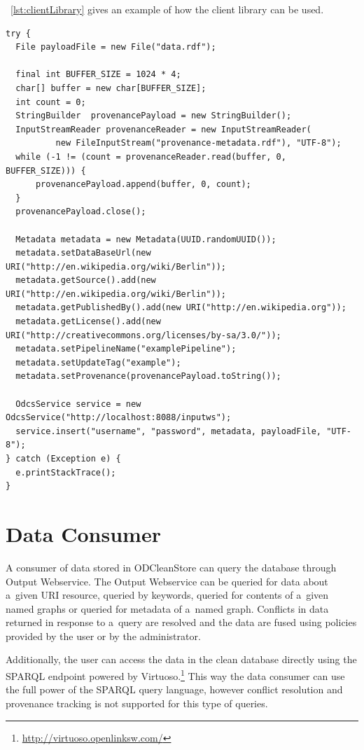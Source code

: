 \lstlistingname~\ref{lst:clientLibrary} gives an example of how the client library can be used.

\begin{lstlisting}[caption={Example usage of Input Webservice client library},label=lst:clientLibrary]
try {
  File payloadFile = new File("data.rdf");

  final int BUFFER_SIZE = 1024 * 4;
  char[] buffer = new char[BUFFER_SIZE];
  int count = 0;
  StringBuilder  provenancePayload = new StringBuilder();
  InputStreamReader provenanceReader = new InputStreamReader(
          new FileInputStream("provenance-metadata.rdf"), "UTF-8");
  while (-1 != (count = provenanceReader.read(buffer, 0, BUFFER_SIZE))) {
      provenancePayload.append(buffer, 0, count);
  }
  provenancePayload.close();

  Metadata metadata = new Metadata(UUID.randomUUID());
  metadata.setDataBaseUrl(new URI("http://en.wikipedia.org/wiki/Berlin"));
  metadata.getSource().add(new URI("http://en.wikipedia.org/wiki/Berlin"));
  metadata.getPublishedBy().add(new URI("http://en.wikipedia.org"));
  metadata.getLicense().add(new URI("http://creativecommons.org/licenses/by-sa/3.0/")); 
  metadata.setPipelineName("examplePipeline");
  metadata.setUpdateTag("example"); 
  metadata.setProvenance(provenancePayload.toString()); 

  OdcsService service = new OdcsService("http://localhost:8088/inputws");
  service.insert("username", "password", metadata, payloadFile, "UTF-8");
} catch (Exception e) {
  e.printStackTrace();
}
\end{lstlisting}

\section{Data Consumer}
\label{sec:outputWS}

A consumer of data stored in ODCleanStore can query the database through Output Webservice. The Output Webservice can be queried for data about a~given URI resource, queried by keywords, queried for contents of a~given named graphs or queried for metadata of a~named graph. Conflicts in data returned in response to a~query are resolved and the data are fused using policies provided by the user or by the administrator.

Additionally, the user can access the data in the clean database directly using the SPARQL endpoint powered by Virtuoso.\footnote{\url{http://virtuoso.openlinksw.com/}} This way the data consumer can use the full power of the SPARQL query language, however conflict resolution and provenance tracking is not supported for this type of queries.

